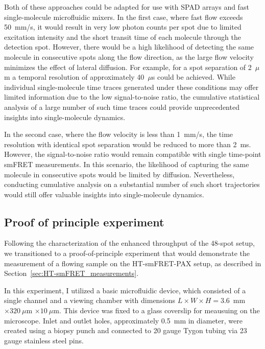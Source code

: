 Both of these approaches could be adapted for use with \ac{SPAD} arrays and fast single-molecule microfluidic mixers. 
In the first case, where fast flow exceeds 50~mm/s, it would result in very low photon counts per spot due to limited excitation intensity and the short transit time of each molecule through the detection spot. 
However, there would be a high likelihood of detecting the same molecule in consecutive spots along the flow direction, as the large flow velocity minimizes the effect of lateral diffusion. 
For example, for a spot separation of 2~$\mu$m a temporal resolution of approximately 40~$\mu$s could be achieved. 
While individual single-molecule time traces generated under these conditions may offer limited information due to the low signal-to-noise ratio, the cumulative statistical analysis of a large number of such time traces could provide unprecedented insights into single-molecule dynamics.

In the second case, where the flow velocity is less than 1~mm/s, the time resolution with identical spot separation would be reduced to more than 2~ms. 
However, the signal-to-noise ratio would remain compatible with single time-point \ac{smFRET} measurements. 
In this scenario, the likelihood of capturing the same molecule in consecutive spots would be limited by diffusion. 
Nevertheless, conducting cumulative analysis on a substantial number of such short trajectories would still offer valuable insights into single-molecule dynamics.

\subsection{Proof of principle experiment}
\label{sec:microfluidics_experiment}

Following the characterization of the enhanced throughput of the 48-spot setup, we transitioned to a proof-of-principle experiment that would demonstrate the measurement of a flowing sample on the \ac{HT-smFRET}-PAX setup, as described in Section~\ref{sec:HT-smFRET_measurements}.

In this experiment, I utilized a basic microfluidic device, which consisted of a single channel and a viewing chamber with dimensions $L \times W \times H = 3.6$~mm $\times  320~\mu$m $\times 10~\mu$m. 
This device was fixed to a glass coverslip for meausuing on the microscope.
Inlet and outlet holes, approximately 0.5~mm in diameter, were created using a biopsy punch and connected to 20 gauge Tygon tubing via 23 gauge stainless steel pins.

